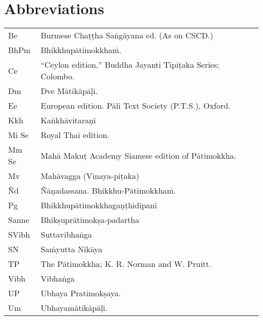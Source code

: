 
\chapter{Abbreviations}
\label{abbreviations}


\ifninebythirteenversion

\vspace{-0.6em}
\begin{tabular}{@{}llll@{}}
  Be & Burmese Chaṭṭha Saṅgāyana ed. (As on CSCD.)\\
  BhPm & Bhikkhupātimokkhaṁ.\\
  Ce & “Ceylon edition,” Buddha Jayanti Tipiṭaka Series; Colombo.\\
  Dm & Dve Mātikāpāḷi.\\
  Ee & European edition. Pāli Text Society (P.T.S.), Oxford.\\
  Kkh & Kaṅkhāvitaraṇī\\
  Mi Se & Royal Thai edition.\\
  Mm Se & Mahā Makuṭ Academy Siamese edition of Pātimokkha.\\
  Mv & Mahāvagga (Vinaya-piṭaka)\\
  Ñd & Ñāṇadassana. Bhikkhu-Pātimokkhaṁ.\\
  Pg & Bhikkhupātimokkhagaṇṭhidīpanī\\
  Sanne & Bhikṣuprātimokṣa-padartha\\
  SVibh & Suttavibhaṅga\\
  SN    & Saṁyutta Nikāya\\
  TP & The Pātimokkha; K. R. Norman and W. Pruitt.\\
  Vibh & Vibhaṅga\\
  UP & Ubhaya Pratimokṣaya.\\
  Um & Ubhayamātikāpāḷi.\\
\end{tabular}

\else

